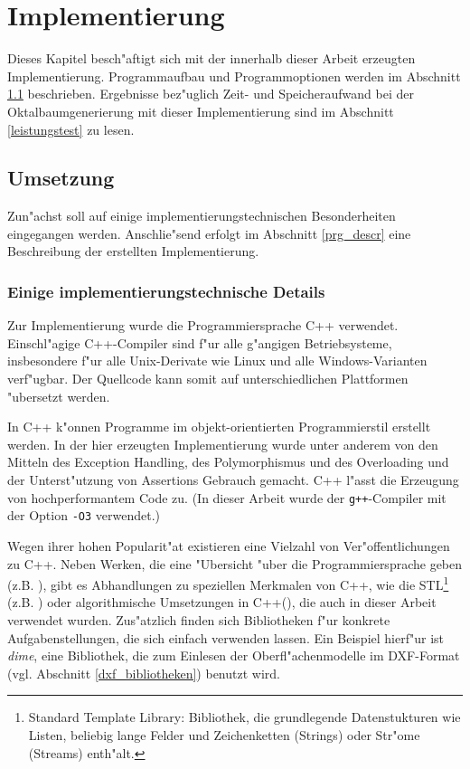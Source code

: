 %
%   

\chapter{Implementierung}
\label{impl}
Dieses Kapitel besch"aftigt sich mit der innerhalb dieser Arbeit erzeugten 
Implementierung. Programmaufbau und Programmoptionen werden im Abschnitt 
\ref{umsetzung} beschrieben. Ergebnisse bez"uglich Zeit- und 
Speicheraufwand bei der Oktalbaumgenerierung mit dieser Implementierung sind 
im Abschnitt \ref{leistungstest} zu lesen.

\section{Umsetzung}
\label{umsetzung}
Zun"achst soll auf einige implementierungstechnischen Besonderheiten 
eingegangen werden. Anschlie"send erfolgt im Abschnitt \ref{prg_descr} 
eine Beschreibung der erstellten Implementierung. 

\subsection{Einige implementierungstechnische Details} 
Zur Implementierung wurde die Programmiersprache C++ verwendet. 
Einschl"agige C++-Compiler sind f"ur alle g"angigen Betriebsysteme, 
insbesondere f"ur alle Unix-Derivate wie Linux und alle Windows-Varianten 
verf"ugbar. Der Quellcode kann somit auf unterschiedlichen Plattformen 
"ubersetzt werden. 

In C++ k"onnen Programme im objekt-orientierten Programmierstil erstellt 
werden. In der hier erzeugten Implementierung wurde 
unter anderem von den Mitteln des Exception Handling, des Polymorphismus und 
des Overloading und der Unterst"utzung von Assertions Gebrauch gemacht. 
C++ l"asst die Erzeugung von hochperformantem Code  zu. (In dieser Arbeit 
wurde der \texttt{g++}-Compiler mit der Option \texttt{-O3} verwendet.)

Wegen ihrer hohen Popularit"at existieren eine Vielzahl von 
Ver"offentlichungen zu C++. Neben Werken, die eine "Ubersicht "uber die 
Programmiersprache geben (z.B. \cite{prgspr_cpp}), gibt es Abhandlungen 
zu speziellen Merkmalen von C++, wie die 
STL\footnote{Standard Template Library: Bibliothek, die grundlegende 
Datenstukturen wie Listen, beliebig lange Felder und Zeichenketten (Strings) 
oder Str"ome (Streams) enth"alt.} (z.B. \cite{stl}) oder algorithmische 
Umsetzungen in C++(\cite{algo_cpp}), die auch in dieser Arbeit verwendet 
wurden. Zus"atzlich finden sich Bibliotheken f"ur konkrete Aufgabenstellungen, 
die sich einfach verwenden lassen. Ein Beispiel hierf"ur ist 
\emph{dime}, eine Bibliothek, 
die zum Einlesen der Oberfl"achenmodelle 
im DXF-Format (vgl. Abschnitt \ref{dxf_bibliotheken}) benutzt wird.

